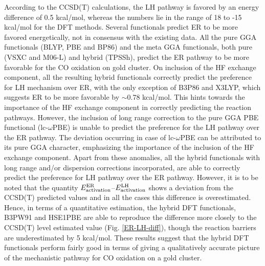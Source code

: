 According to the CCSD(T) calculations, the LH pathway is favored by an energy difference of 0.5 kcal/mol, whereas the numbers lie in the range of 18 to -15 kcal/mol for the DFT methods. Several functionals predict ER to be more favored energetically, not in consensus with the existing data. All the pure GGA functionals (BLYP, PBE and BP86) and the meta GGA functionals, both pure (VSXC and M06-L) and hybrid (TPSSh), predict the ER pathway to be more favorable for the CO oxidation on gold cluster. On inclusion of the HF exchange component, all the resulting hybrid functionals correctly predict the preference for LH mechanism over ER, with the only exception of B3P86 and X3LYP, which suggests ER to be more favorable by $\sim$0.78 kcal/mol. This hints towards the importance of the HF exchange component in correctly predicting the reaction pathways. However, the inclusion of long range correction to the pure GGA PBE functional (lc-$\omega$PBE) is unable to predict the preference for the LH pathway over the ER pathway. The deviation occurring in case of lc-$\omega$PBE can be attributed to its pure GGA character, emphasizing the importance of the inclusion of the HF exchange component. Apart from these anomalies, all the hybrid functionals with long range and/or dispersion corrections incorporated, are able to correctly predict the preference for LH pathway over the ER pathway. However, it is to be noted that the quantity $E_{\rm{activation}}^{\rm{ER}}$--$E_{\rm{activation}}^{\rm{LH}}$ shows a deviation from the CCSD(T) predicted values and in all the cases this difference is overestimated. Hence, in terms of a quantitative estimation, the hybrid DFT functionals, B3PW91 and HSE1PBE are able to reproduce the difference more closely to the CCSD(T) level estimated value (Fig. \ref{ER-LH-diff}), though the reaction barriers are underestimated by 5 kcal/mol. These results suggest that the hybrid DFT functionals perform fairly good in terms of giving a qualitatively accurate picture of the mechanistic pathway for CO oxidation on a gold cluster.

